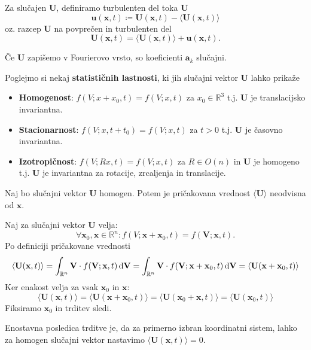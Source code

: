 \documentclass[mat2, tisk]{fmfdelo}
\newcommand{\R}{\mathbb R}
\newcommand{\bd}{\textbf}
\begin{document}
\begin{definicija}
Za slučajen $\bd{U}$, definiramo turbulenten del toka $\bd{U}$
\begin{equation}
\bd{u}(\bd{x}, t) \coloneqq \bd{U}(\bd{x}, t) -  \langle \bd{U}(\bd{x}, t) \rangle
\end{equation}
oz. razcep $\bd{U}$ na povprečen in turbulenten del
\begin{equation}
\label{Reynoldsov razcep}
\bd{U}(\bd{x}, t) = \langle \bd{U}(\bd{x}, t) \rangle + \bd{u}(\bd{x}, t).
\end{equation}
\end{definicija}
Če $\bd{U}$ zapišemo v Fourierovo vrsto, so koeficienti $\bd{a}_k$ slučajni.

Poglejmo si nekaj \textbf{statističnih lastnosti}, ki jih slučajni 
vektor $\bd{U}$ lahko prikaže
\begin{itemize}
  \item \textbf{Homogenost}: $f(V; x + x_0, t) = f(V; x, t)$ za $x_0 \in \R^3$ t.j. $\bd{U}$ je 
  translacijsko invariantna.
  \item \textbf{Stacionarnost}: $f(V; x, t + t_0) = f(V; x, t)$ za $t>0$ t.j. $\bd{U}$ je 
  časovno invariantna. 
  \item \textbf{Izotropičnost}: $f(V; Rx, t) = f(V; x, t)$ za $R\in O(n)$ in $\bd{U}$ je homogeno t.j. $\bd{U}$ je 
  invariantna za rotacije, zrcaljenja in translacije. 
\end{itemize} 

\begin{lema}
\label{homogenost}
Naj bo slučajni vektor $\bd{U}$ homogen. Potem je pričakovana 
vrednost $\langle \bd{U} \rangle$ neodvisna od $\bd{x}$. 
\end{lema}

\begin{dokaz}
Naj za slučajni vektor $\bd{U}$ velja:
$$\forall \bd{x}_0, \bd{x} \in \R^n: f(V; \bd{x} + \bd{x}_0, t) = f(\bd{V}; \bd{x}, t).$$
Po definiciji pričakovane vrednosti
$$
\langle \bd{U}(\bd{x}, t) \rangle = \int_{\R^n} \bd{V} \cdot f(\bd{V}; \bd{x}, t) \dif \bd{V} = \int_{\R^n} \bd{V} \cdot f(\bd{V}; \bd{x} + \bd{x}_0, t) \dif \bd{V} = \langle \bd{U}(\bd{x} + \bd{x}_0, t) \rangle
$$
Ker enakost velja za vsak $\bd{x}_0$ in $\bd{x}$: 
$$
\langle \bd{U}(\bd{x}, t) \rangle = \langle \bd{U}(\bd{x} + \bd{x}_0, t) \rangle = \langle \bd{U}(\bd{x}_0 + \bd{x}, t) \rangle = \langle \bd{U}(\bd{x}_0, t) \rangle
$$
Fiksiramo $\bd{x}_0$ in trditev sledi.
\end{dokaz}
\noindent
Enostavna posledica trditve je, da za primerno izbran koordinatni sistem,
lahko za homogen slučajni vektor nastavimo $\langle \bd{U}(\bd{x}, t) \rangle = 0$.
\end{document}
